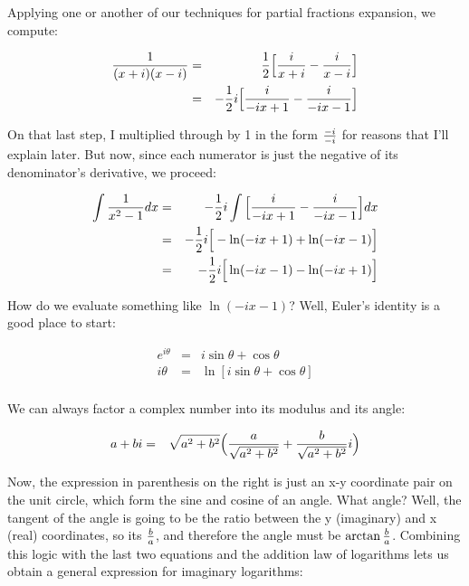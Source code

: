 Applying one or another of our techniques for partial fractions
expansion, we compute:

\begin{eqnarray*}
{1\over{(x+i)(x-i)}} &=& {1\over2}\Big[{i\over{x+i}} - {i\over{x-i}}\Big]\\
              &=& -{1\over2}i\Big[{i\over{-ix+1}} - {i\over{-ix-1}}\Big]\\
\end{eqnarray*}

On that last step, I multiplied through by 1 in the form
${-i}\over{-i}$ for reasons that I'll explain later.
But now, since each numerator is just the negative
of its denominator's derivative, we proceed:

\begin{eqnarray*}
\int{1\over{x^2-1}}dx &=& -{1\over2}i\int\Big[{i\over{-ix+1}} - {i\over{-ix-1}}\Big]dx\\
	&=& -{1\over2}i\Big[-\ln(-ix+1) + \ln(-ix-1)\Big] \\
	&=& -{1\over2}i\Big[\ln(-ix-1) - \ln(-ix+1)\Big] \\
\end{eqnarray*}

How do we evaluate something like $\ln(-ix-1)$?  Well, Euler's identity
is a good place to start:

\begin{eqnarray*}
e^{i\theta} &=& i\sin\theta + \cos\theta \\
{i\theta} &=& \ln[i\sin\theta + \cos\theta] \\
\end{eqnarray*}

We can always factor a complex number into its modulus and its angle:

\begin{eqnarray*}
a+bi &=& \sqrt{a^2+b^2}\Big({a\over\sqrt{a^2+b^2}} + {b\over\sqrt{a^2+b^2}}i\Big) \\
\end{eqnarray*}

Now, the expression in parenthesis on the right is just an x-y
coordinate pair on the unit circle, which form the sine and cosine of
an angle.  What angle?  Well, the tangent of the angle is going to be
the ratio between the y (imaginary) and x (real) coordinates, so its
$b\over a$, and therefore the angle must be $\arctan {b\over a}$.
Combining this logic with the last two equations and the addition law
of logarithms lets us obtain a general expression for imaginary
logarithms:

